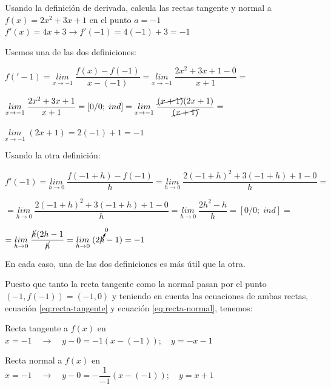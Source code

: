 	\begin{ejem} Usando la definición de derivada, calcula las rectas tangente y normal a $f(x)=2x^2+3x+1$ en el punto $a=-1 \qquad $\scriptsize{\textcolor{gris}{$f'(x)=4x+3 \to f'(-1)=4(-1)+3=-1$}}
	
	\normalsize
	Usemos una de las dos definiciones:
	
	$f('-1)=\underset {x\to -1}{lim}\;{\dfrac {f(x)-f(-1)}{x-(-1)}}= \underset {x\to -1}{lim}\;{\dfrac {2x^2+3x+1-0}{x+1}}=$
	
	$\underset {x\to -1}{lim}\;{\dfrac {2x^2+3x+1}{x+1}}=[0/0; \; ind]= \underset {x\to -1}{lim}\;{\dfrac {\cancel{(x+1)}(2x+1)}{\cancel{(x+1)}}}=$
	
	$\underset {x\to -1}{lim}\;{(2x+1)=2(-1)+1=-1}$
	
	Usando la otra definición:
	
	$f'(-1)=\underset {h\to 0}{lim}\; {\dfrac {f(-1+h)-f(-1)} {h}}= \underset {h\to 0}{lim}\; {\dfrac {2(-1+h)^2+3(-1+h)+1-0} {h}}=$
	
	$=\underset {h\to 0}{lim}\; {\dfrac {2(-1+h)^2+3(-1+h)+1-0} {h}}= \underset {h\to 0}{lim}\; {\dfrac {2h^2-h} {h}}=[0/0;\; ind]=$
	
	$ = \underset {h\to 0}{lim}\; {\dfrac {\cancel{h}(2h-1} {\cancel{h}}}=\underset {h\to 0}{lim}\; {(2 \cancelto{0}{h} - 1)}=-1$
	
	En cada caso, una de las dos definiciones es más útil que la otra.
	
	Puesto que tanto la recta tangente como la normal pasan por el punto $(-1,f(-1))=(-1,0)$ y teniendo en cuenta las ecuaciones de ambas rectas, ecuación \ref{eq:recta-tangente} y ecuación \ref{eq:recta-normal}, tenemos:
	
	Recta tangente a $f(x)$ en $x=-1 \quad \to \quad y-0=-1(x-(-1)); \quad y=-x-1$
	
	Recta normal a $f(x)$ en $x=-1 \quad \to \quad y-0=-\dfrac {1}{-1}(x-(-1)); \quad y=x+1$
	
	\end{ejem}
	
